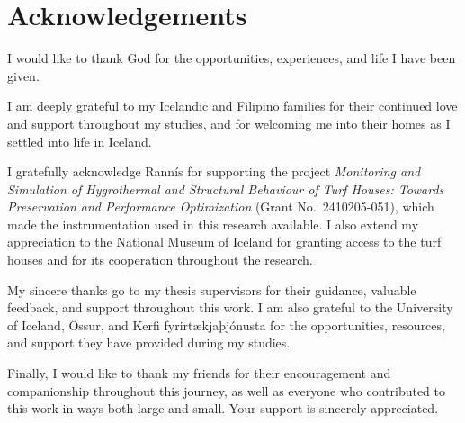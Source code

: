 \chapter*{Acknowledgements}

I would like to thank God for the opportunities, experiences, and life I have been given.

I am deeply grateful to my Icelandic and Filipino families for their continued love and support throughout my studies, and for welcoming me into their homes as I settled into life in Iceland.

I gratefully acknowledge Rannís for supporting the project \emph{Monitoring and Simulation of Hygrothermal and Structural Behaviour of Turf Houses: Towards Preservation and Performance Optimization} (Grant No.\ 2410205-051), which made the instrumentation used in this research available. I also extend my appreciation to the National Museum of Iceland for granting access to the turf houses and for its cooperation throughout the research.

My sincere thanks go to my thesis supervisors for their guidance, valuable feedback, and support throughout this work. I am also grateful to the University of Iceland, Össur, and Kerfi fyrirtækjaþjónusta for the opportunities, resources, and support they have provided during my studies.

Finally, I would like to thank my friends for their encouragement and companionship throughout this journey, as well as everyone who contributed to this work in ways both large and small. Your support is sincerely appreciated.

